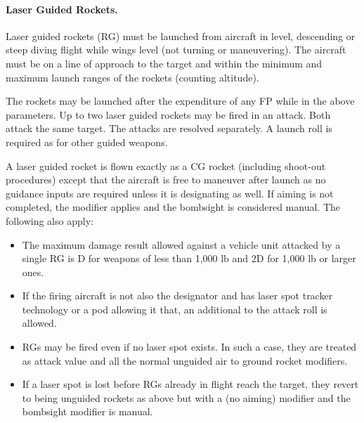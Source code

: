 \paragraph{Laser Guided Rockets.} Laser guided rockets (RG) must be launched from aircraft in level, descending or steep diving flight while wings level (not turning or maneuvering). The aircraft must be on a line of approach to the target and within the minimum and maximum launch ranges of the rockets (counting altitude).

The rockets may be launched after the expenditure of any FP while in the above parameters. Up to two laser guided rockets may be fired in an attack. Both attack the same target. The attacks are resolved separately. A launch roll is required as for other guided weapons.

A laser guided rocket is flown exactly as a CG rocket (including shoot-out procedures) except that the aircraft is free to maneuver after launch as no guidance inputs are required unless it is designating as well. If aiming is not completed, the  modifier applies and the bombsight is considered manual. The following also apply:

\begin{itemize}

    \item The maximum damage result allowed against a vehicle unit attacked by a single RG is D for weapons of less than 1,000 lb and 2D for 1,000 lb or larger ones.

    \item If the firing aircraft is not also the designator and has laser spot tracker technology or a pod allowing it that, an additional  to the attack roll is allowed.

    \item RGs may be fired even if no laser spot exists. In such a case, they are treated as  attack value and all the normal unguided air to ground rocket modifiers.

    \item If a laser spot is lost before RGs already in flight reach the target, they revert to being unguided rockets as above but with a  (no aiming) modifier and the bombsight modifier is manual.

\end{itemize}
